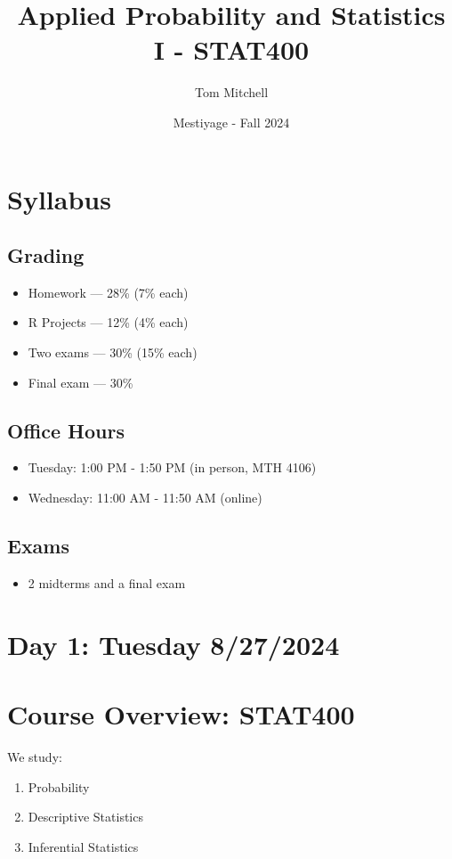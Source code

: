 \documentclass{article}
\title{Applied Probability and Statistics I - STAT400}
\author{Tom Mitchell}
\date{Mestiyage - Fall 2024}
\begin{document}
\maketitle

\section*{Syllabus}

\subsection*{Grading}
\begin{itemize}
    \item Homework — 28\% (7\% each)
    \item R Projects — 12\% (4\% each)
    \item Two exams — 30\% (15\% each)
    \item Final exam — 30\%
\end{itemize}

\subsection*{Office Hours}
\begin{itemize}
    \item Tuesday: 1:00 PM - 1:50 PM (in person, MTH 4106)
    \item Wednesday: 11:00 AM - 11:50 AM (online)
\end{itemize}

\subsection*{Exams}
\begin{itemize}
    \item 2 midterms and a final exam
\end{itemize}

\section*{Day 1: Tuesday 8/27/2024}

\section*{Course Overview: STAT400}
We study:
\begin{enumerate}
    \item Probability
    \item Descriptive Statistics
    \item Inferential Statistics
\end{enumerate}
\end{document}
